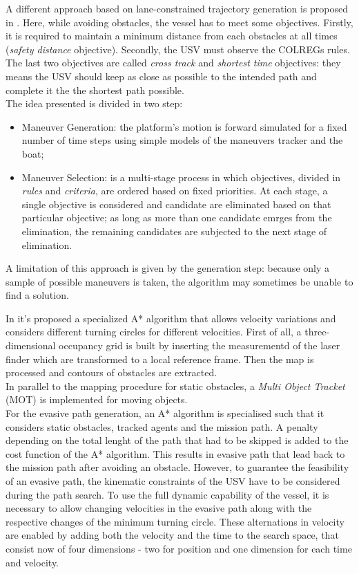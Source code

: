 \documentclass[12pt]{article}
\begin{document}
              A different approach based on lane-constrained trajectory generation is proposed in \parencite{Tan2010}. Here, while avoiding obstacles, the vessel has to meet some objectives. Firstly, it is required to maintain a minimum distance from each obstacles at all times (\textit{safety distance} objective). Secondly, the USV must observe the COLREGs rules. The last two objectives are called \textit{cross track} and \textit{shortest time} objectives: they means the USV should keep as close as possible to the intended path and complete it the the shortest path possible.\\
              The idea presented is divided in two step:
                    \begin{itemize}
                          \item Maneuver Generation: the platform's motion is forward simulated for a fixed number of time steps using simple models of the maneuvers tracker and the boat;
                          \item Maneuver Selection: is a multi-stage process in which objectives, divided in \textit{rules} and \textit{criteria}, are ordered based on fixed priorities. At each stage, a single objective is considered and candidate are eliminated based on that particular objective; as long as more than one candidate emrges from the elimination, the remaining candidates are subjected to the next stage of elimination.
                    \end{itemize}
              A limitation of this approach is given by the generation step: because only a sample of possible maneuvers is taken, the algorithm may sometimes be unable to find a solution.

              \indent In \parencite{Blaich2015} it's proposed a specialized A* algorithm that allows velocity variations and considers different turning circles for different velocities. First of all, a three-dimensional occupancy grid is built by inserting the measurementd of the laser finder which are transformed to a local reference frame. Then the map is processed and contours of obstacles are extracted.\\
              In parallel to the mapping procedure for static obstacles, a \textit{Multi Object Tracket} (MOT) is implemented for moving objects.\\
              For the evasive path generation, an A* algorithm is specialised such that it considers static obstacles, tracked agents and the mission path. A penalty depending on the total lenght of the path that had to be skipped is added to the cost function of the A* algorithm. This results in evasive path that lead back to the mission path after avoiding an obstacle. However, to guarantee the feasibility of an evasive path, the kinematic constraints of the USV have to be considered during the path search. To use the full dynamic capability of the vessel, it is necessary to allow changing velocities in the evasive path along with the respective changes of the minimum turning circle. These alternations in velocity are enabled by adding both the velocity and the time to the search space, that consist now of four dimensions - two for position and one dimension for each time and velocity.
\end{document}
